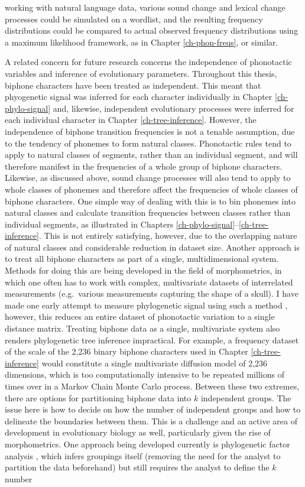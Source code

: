 working with natural language data, various sound change and lexical change processes could be simulated on a wordlist, and the resulting frequency distributions could be compared to actual observed frequency distributions using a maximum likelihood framework, as in Chapter \ref{ch-phon-freqs}, or similar.

A related concern for future research concerns the independence of phonotactic variables and inference of evolutionary parameters. Throughout this thesis, biphone characters have been treated as independent. This meant that phyogenetic signal was inferred for each character individually in Chapter \ref{ch-phylo-signal} and, likewise, independent evolutionary processes were inferred for each individual character in Chapter \ref{ch-tree-inference}. However, the independence of biphone transition frequencies is not a tenable assumption, due to the tendency of phonemes to form natural classes. Phonotactic rules tend to apply to natural classes of segments, rather than an individual segment, and will therefore manifest in the frequencies of a whole group of biphone characters. Likewise, as discussed above, sound change processes will also tend to apply to whole classes of phonemes and therefore affect the frequencies of whole classes of biphone characters. One simple way of dealing with this is to bin phonemes into natural classes and calculate transition frequencies between classes rather than individual segments, as illustrated in Chapters \ref{ch-phylo-signal}--\ref{ch-tree-inference}. This is not entirely satisfying, however, due to the overlapping nature of natural classes and considerable reduction in dataset size. Another approach is to treat all biphone characters as part of a single, multidimensional system. Methods for doing this are being developed in the field of morphometrics, in which one often has to work with complex, multivariate datasets of interrelated measurements (e.g.~various measurements capturing the shape of a skull). I have made one early attempt to measure phylogenetic signal using such a method \autocite{macklin-cordes_phylogeny_2018}, however, this reduces an entire dataset of phonotactic variation to a single distance matrix. Treating biphone data as a single, multivariate system also renders phylogenetic tree inference impractical. For example, a frequency dataset of the scale of the 2,236 binary biphone characters used in Chapter \ref{ch-tree-inference} would constitute a single multivariate diffusion model of 2,236 dimensions, which is too computationally intensive to be repeated millions of times over in a Markov Chain Monte Carlo process. Between these two extremes, there are options for partitioning biphone data into \(k\) independent groups. The issue here is how to decide on how the number of independent groups and how to delineate the boundaries between them. This is a challenge and an active area of development in evolutionary biology as well, particularly given the rise of morphometrics. One approach being developed currently is phylogenetic factor analysis \autocites{tolkoff_phylogenetic_2018}{hassler_inferring_2020}, which infers groupings itself (removing the need for the analyst to partition the data beforehand) but still requires the analyst to define the \(k\) number 